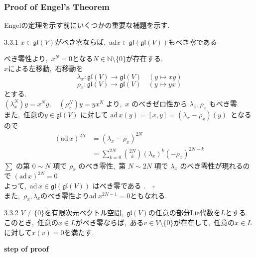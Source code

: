 \documentclass[uplatex,dvipdfmx]{jsarticle}
\begin{document}
\newpage
\subsubsection{Proof of Engel's Theorem}
Engelの定理を示す前にいくつかの重要な補題を示す.
\begin{mylemma}{3.3.1}
    $x\in \mathfrak{gl}(V)$がべき零ならば,~ad$x \in \mathfrak{gl}(\mathfrak{gl}(V))$もべき零である
\end{mylemma}
\begin{myproof}
べき零性より,~$x^N=0$となる$N\in \mathbb{N}\setminus\{0\}$が存在する.\\
$x$による左移動,~右移動を
\begin{equation*}
    \lambda_x : \mathfrak{gl}(V) \to \mathfrak{gl}(V) \quad (y \mapsto xy)
\end{equation*}
\begin{equation*}
    \rho_x : \mathfrak{gl}(V) \to \mathfrak{gl}(V) \quad (y \mapsto yx)
\end{equation*}
とする.\\
$(\lambda_x^N) y = x^N y, \quad (\rho_x^N) y = y x^N$ より,~$x$ のべきゼロ性から $\lambda_x, \rho_x$ もべき零.\\
また,~任意の$y \in \mathfrak{gl}(V)$ に対して $\text{ad}\,x(y) = [x, y] = (\lambda_x - \rho_x)(y)$~となるので
\begin{equation*}
    \begin{split}
        (\text{ad}\,x)^{2N} &= (\lambda_x - \rho_x)^{2N} \\ &= \sum_{k=0}^{2N} \binom{2N}{k} (\lambda_x)^k (-\rho_x)^{2N-k} 
    \end{split}
\end{equation*}
$\sum$ の第 $0 \sim N$ 項で $\rho_x$ のべき零性,~第 $N \sim 2N$ 項で $\lambda_x$ のべき零性が現れるので $(\text{ad}\,x)^{2N} = 0$ \\
よって,~$\text{ad}\,x \in \mathfrak{gl}(\mathfrak{gl}(V))$ はべき零である .~~$\square$\\
また,~$\rho_x,\lambda_x$のべき零性より$\text{ad}~x^{2N-1}=0$ともなれる.
\end{myproof}
\newpage
\begin{mythm}{3.3.2}
    $V\neq\{0\}$を有限次元ベクトル空間,~$\mathfrak{gl}(V)$の任意の部分Lie代数を$L$とする.\\
    このとき,~任意の$x\in L$がべき零ならば,~ある$v\in V \setminus\{0\}$が存在して,~任意の$x\in L$に対して$x(v)=0$を満たす.
\end{mythm}
\textbf{step of proof}\\
\end{document}
